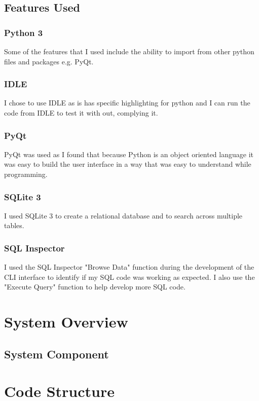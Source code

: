 \subsection{Features Used}
\subsubsection{Python 3}
Some of the features that I used include the ability to import from other python files and packages e.g. PyQt.
\subsubsection{IDLE}
I chose to use IDLE as is has specific highlighting for python and I can run the code from IDLE to test it with out, complying it.
\subsubsection{PyQt}
PyQt was used as I found that because Python is an object oriented language it was easy to build the user interface in a way that was easy to understand while programming.
\subsubsection{SQLite 3}
I used SQLite 3 to create a relational database and to search across multiple tables.
\subsubsection{SQL Inspector}
I used the SQL Inspector "Browse Data" function during the development of the CLI interface to identify if my SQL code was working as expected. I also use the "Execute Query" function to help develop more SQL code.

\section{System Overview}

\subsection{System Component}

\section{Code Structure}

